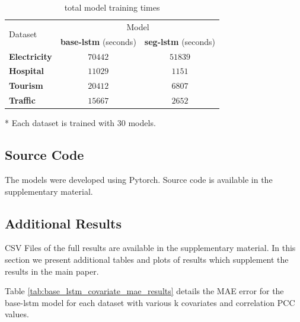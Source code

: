 \documentclass{article}
\begin{document}
\begin{table}[tbp]
  \caption{total model training times}
  \centering
  \begin{threeparttable}
  \begin{small}
  \renewcommand{\multirowsetup}{\centering}
  \setlength{\tabcolsep}{8pt}
  \begin{tabular}{lcc}
    \toprule
    \multirow{2}{*}{Dataset} & \multicolumn{2}{c}{Model} \\
    \cmidrule{2-3}
     & \textbf{base-lstm} (seconds) & \textbf{seg-lstm} (seconds)\\
    \midrule
    \multirow{1}{*}{\textbf{Electricity}} & $70442$ & $51839$ \\
    \midrule
    \multirow{1}{*}{\textbf{Hospital}} & $11029$ & $1151$ \\
    \midrule
    \multirow{1}{*}{\textbf{Tourism}} & $20412$ & $6807$ \\
    \midrule
    \multirow{1}{*}{\textbf{Traffic}} & $15667$ & $2652$ \\
    \bottomrule
  \end{tabular}
  \begin{tablenotes}
    \item[*] Each dataset is trained with 30 models.
  \end{tablenotes}
  \end{small}
  \end{threeparttable}
  \vspace{-15pt}
  \label{tab:training_time}
\end{table}

\subsection{Source Code}
The models were developed using Pytorch. Source code is available in the supplementary material. 
\FloatBarrier

\subsection{Additional Results}
CSV Files of the full results are available in the supplementary material.
In this section we present additional tables and plots of results which supplement the results in the main paper. 

Table \ref{tab:base_lstm_covariate_mae_results} details
the MAE error for the base-lstm model for each dataset with various k covariates and correlation PCC values.  
\end{document}
